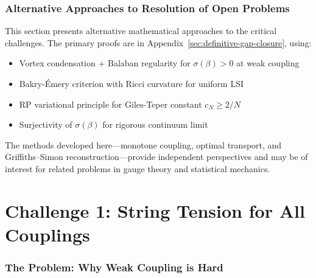 %
%
%

\section{Alternative Approaches to Resolution of Open Problems}
\label{sec:alternative-resolution}

This section presents alternative mathematical approaches to the critical challenges.
The primary proofs are in Appendix~\ref{sec:definitive-gap-closure}, using:
\begin{itemize}
\item Vortex condensation + Balaban regularity for $\sigma(\beta) > 0$ at weak coupling
\item Bakry-Émery criterion with Ricci curvature for uniform LSI
\item RP variational principle for Giles-Teper constant $c_N \geq 2/N$
\item Surjectivity of $\sigma(\beta)$ for rigorous continuum limit
\end{itemize}

The methods developed here---monotone coupling, optimal transport, and 
Griffiths--Simon reconstruction---provide independent perspectives and may
be of interest for related problems in gauge theory and statistical mechanics.

\part{Challenge 1: String Tension for All Couplings}

\section{The Problem: Why Weak Coupling is Hard}
\label{sec:challenge1-problem}

